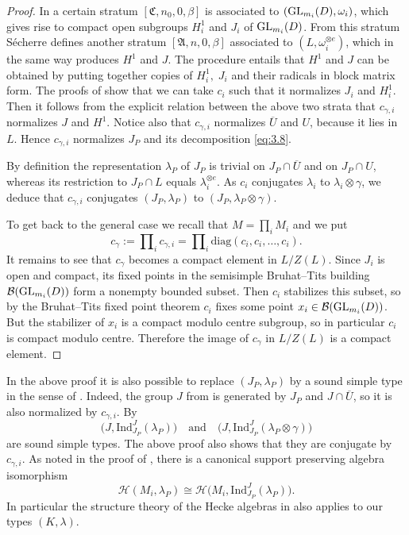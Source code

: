 \documentclass[11pt]{amsart}
\theoremstyle{definition}
\begin{document}
\begin{proof}
In \cite{SeSt4} a certain stratum $[\mathfrak C,n_0,0,\beta]$ is associated to 
$({{\rm GL}}_{m_i} (D), \omega_i)$, which gives rise to compact open subgroups $H^1_i$ and 
$J_i$ of ${{\rm GL}}_{m_i} (D)$. From this stratum S\'echerre \cite[5.2.2]{Sec3} defines 
another stratum $[\mathfrak A,n,0,\beta]$ associated to
$(L,\omega_i^{\otimes e})$, which in the same way produces $H^1$ and $J$. The procedure
entails that $H^1$ and $J$ can be obtained by putting together copies of $H_i^1, \; J_i$
and their radicals in block matrix form. 
The proofs of \cite[Theorem 7.2 and Corollary 7.3]{SeSt6} show that we can take 
$c_i$ such that it normalizes $J_i$ and $H^1_i$. Then it follows from the explicit 
relation between the above two strata that $c_{\gamma,i}$ normalizes $J$ and $H^1$.
Notice also that $c_{\gamma,i}$ normalizes $\overline{U}$ and $U$, because it lies in $L$.
Hence $c_{\gamma,i}$ normalizes $J_P$ and its decomposition \eqref{eq:3.8}.

By definition \cite[5.2.3]{Sec3} the representation $\lambda_P$ of $J_P$ is trivial on 
$J_P \cap \overline{U}$ and on $J_P \cap U$, whereas its restriction to
$J_P \cap L$ equals $\lambda_i^{\otimes e}$. As $c_i$ conjugates $\lambda_i$ to
$\lambda_i \otimes \gamma$, we deduce that $c_{\gamma,i}$ conjugates $(J_P,\lambda_P)$ to
$(J_P,\lambda_P \otimes \gamma)$. 

To get back to the general case we recall that $M = \prod_i M_i$ and we put
\begin{equation}\label{eq:3.9}
c_\gamma := \prod\nolimits_i c_{\gamma,i} = 
\prod\nolimits_i\text{diag}(c_i,c_i,\ldots,c_i) . 
\end{equation}
It remains to see that $c_\gamma$ becomes a compact element in
$L / Z(L)$. Since $J_i$ is open and compact, its fixed points in the semisimple 
Bruhat--Tits building $\mathcal B ({{\rm GL}}_{m_i} (D))$ form a nonempty bounded subset. 
Then $c_i$ stabilizes this subset, so by the Bruhat--Tits fixed 
point theorem $c_i$ fixes some point $x_i \in \mathcal B ({{\rm GL}}_{m_i}(D))$. But the 
stabilizer of $x_i$ is a compact modulo centre subgroup, so in particular $c_i$ 
is compact modulo centre. Therefore the image of $c_\gamma$ in
$L / Z(L)$ is a compact element.
\end{proof}

In the above proof it is also possible to replace $(J_P,\lambda_P)$
by a sound simple type in the sense of \cite{SeSt6}. Indeed, the group $J$ 
from \cite[\S 5]{Sec3} is generated by $J_P$ and $J \cap \overline{U}$,
so it is also normalized by $c_{\gamma,i}$. By \cite[Proposition 5.4]{Sec3} 
\[
\big( J,\mathrm{Ind}_{J_P}^J (\lambda_P) \big) \quad \text{and} \quad 
\big( J,\mathrm{Ind}_{J_P}^J (\lambda_P \otimes \gamma) \big) 
\]
are sound simple types. The above proof also shows that they are conjugate by 
$c_{\gamma,i}$. As noted in the proof of \cite[Proposition 5.5]{Sec3}, there is
a canonical support preserving algebra isomorphism
\begin{equation}\label{eq:3.14}
{{\mathcal H}} (M_i,\lambda_P) \cong {{\mathcal H}} \big( M_i,\mathrm{Ind}_{J_P}^J (\lambda_P) \big) .
\end{equation}
In particular the structure theory of the Hecke algebras in \cite{Sec3} 
also applies to our types $(K,\lambda)$.
\end{document}

